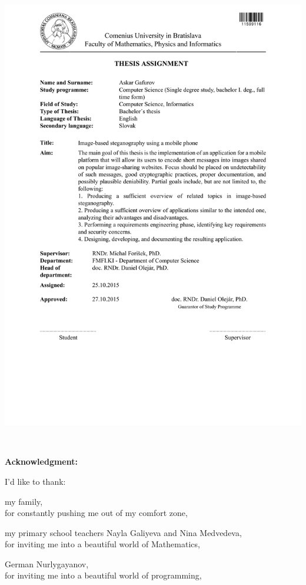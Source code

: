 \documentclass[12pt, oneside]{book}
\def\ack#1#2{#1,\\#2\smallskip}
\begin{document}
\newpage 
\thispagestyle{empty}
\hspace{-2cm}\includegraphics[width=1.1\textwidth]{images/zadanie_en}



\frontmatter

\setcounter{page}{3}
\newpage 
~

\vfill
{\bf Acknowledgment:} 

I'd like to thank:

\ack{my family}{for constantly pushing me out of my comfort zone,}

\ack{my primary school teachers Nayla Galiyeva and Nina Medvedeva}{for inviting me into 
a beautiful world of Mathematics,}

\ack{German Nurlygayanov}{for inviting me into a beautiful world of programming,}
\end{document}
